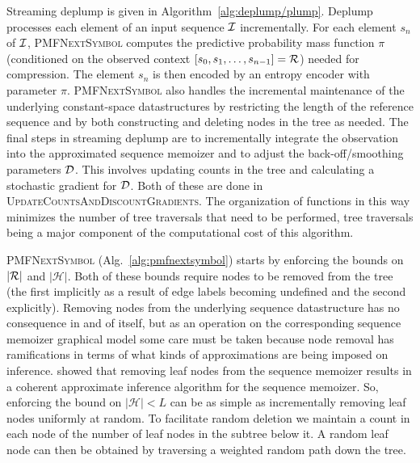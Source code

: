 Streaming deplump is given in Algorithm~\ref{alg:deplump/plump}.  Deplump processes each element of an input sequence $\IS$ incrementally.  For each element $s_n$ of $\IS$, \textsc{PMFNextSymbol} computes the predictive probability mass function $\pi$ (conditioned on the observed context $[s_0, s_1, \ldots, s_{n-1}] = \RS$) needed for compression.  The element $s_n$ is then encoded by an entropy encoder with parameter $\pi$.  \textsc{PMFNextSymbol} also handles the incremental maintenance of the underlying constant-space datastructures by restricting the length of the reference sequence and by both constructing and deleting nodes in the tree as needed.  The final steps in streaming deplump are to incrementally integrate the observation into the approximated sequence memoizer and to adjust the back-off/smoothing parameters $\D$.  This involves updating counts in the tree and calculating a stochastic gradient for $\D$.  Both of these are done in \textsc{UpdateCountsAndDiscountGradients}. %
The organization of functions in this way minimizes the number of tree traversals that need to be performed, tree traversals being a major component of the computational cost of this algorithm.

\textsc{PMFNextSymbol} (Alg.~\ref{alg:pmfnextsymbol}) starts by enforcing the bounds on $|\RS|$ and $|\mathcal{H}|$.  Both of these bounds require nodes to be removed from the tree (the first implicitly as a result of edge labels becoming undefined and the second explicitly).  Removing nodes from the underlying sequence datastructure has no consequence in and of itself, but as an operation on the corresponding sequence memoizer graphical model some care must be taken because node removal has ramifications in terms of what kinds of approximations are being imposed on inference.  \cite{Bartlett2010} showed that removing leaf nodes from the sequence memoizer results in a coherent approximate inference algorithm for the sequence memoizer.  So, enforcing the bound on $| \mathcal{H} | < L$ can be as simple as incrementally removing leaf nodes uniformly at random.  To facilitate random deletion we maintain a count in each node of the number of leaf nodes in the subtree below it.  A random leaf node can then be obtained by traversing a weighted random path down the tree.  

